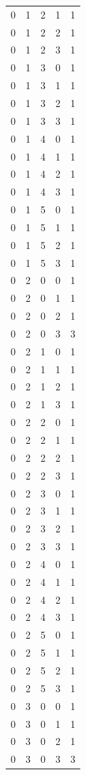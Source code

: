 \begin{longtable}{rrrrr}
0 & 1 & 2 & 1 & 1 \\
0 & 1 & 2 & 2 & 1 \\
0 & 1 & 2 & 3 & 1 \\
0 & 1 & 3 & 0 & 1 \\
0 & 1 & 3 & 1 & 1 \\
0 & 1 & 3 & 2 & 1 \\
0 & 1 & 3 & 3 & 1 \\
0 & 1 & 4 & 0 & 1 \\
0 & 1 & 4 & 1 & 1 \\
0 & 1 & 4 & 2 & 1 \\
0 & 1 & 4 & 3 & 1 \\
0 & 1 & 5 & 0 & 1 \\
0 & 1 & 5 & 1 & 1 \\
0 & 1 & 5 & 2 & 1 \\
0 & 1 & 5 & 3 & 1 \\
0 & 2 & 0 & 0 & 1 \\
0 & 2 & 0 & 1 & 1 \\
0 & 2 & 0 & 2 & 1 \\
0 & 2 & 0 & 3 & 3 \\
0 & 2 & 1 & 0 & 1 \\
0 & 2 & 1 & 1 & 1 \\
0 & 2 & 1 & 2 & 1 \\
0 & 2 & 1 & 3 & 1 \\
0 & 2 & 2 & 0 & 1 \\
0 & 2 & 2 & 1 & 1 \\
0 & 2 & 2 & 2 & 1 \\
0 & 2 & 2 & 3 & 1 \\
0 & 2 & 3 & 0 & 1 \\
0 & 2 & 3 & 1 & 1 \\
0 & 2 & 3 & 2 & 1 \\
0 & 2 & 3 & 3 & 1 \\
0 & 2 & 4 & 0 & 1 \\
0 & 2 & 4 & 1 & 1 \\
0 & 2 & 4 & 2 & 1 \\
0 & 2 & 4 & 3 & 1 \\
0 & 2 & 5 & 0 & 1 \\
0 & 2 & 5 & 1 & 1 \\
0 & 2 & 5 & 2 & 1 \\
0 & 2 & 5 & 3 & 1 \\
0 & 3 & 0 & 0 & 1 \\
0 & 3 & 0 & 1 & 1 \\
0 & 3 & 0 & 2 & 1 \\
0 & 3 & 0 & 3 & 3 \\

\end{longtable}
